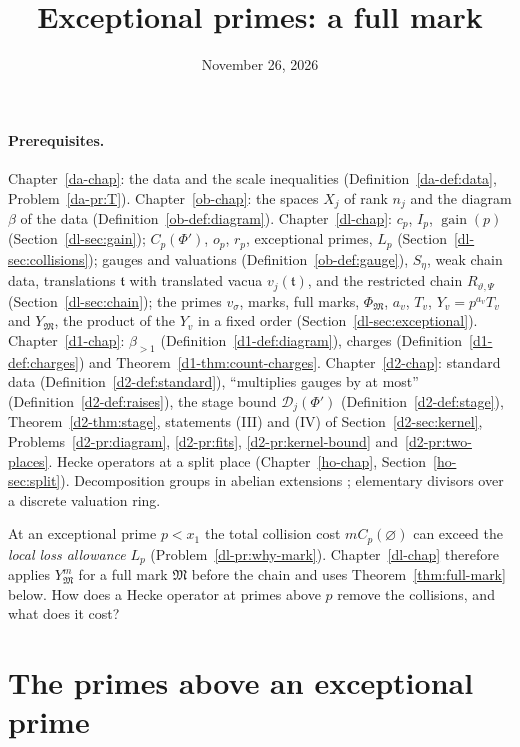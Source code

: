 \documentclass[reqno]{amsart}
\title{Exceptional primes: a full mark}
\author{}
\date{November 26, 2026}
\newcounter{chap}
\theoremstyle{plain}
\theoremstyle{definition}
\theoremstyle{remark}
\newcommand{\Dc}{\mathcal D}
\newcommand{\Mk}{\mathfrak M}
\newcommand{\gain}{\operatorname{gain}}
\newcommand{\bl}{\beta_{>1}}
\begin{document}
\maketitle
{}\label{chap}

\paragraph{Prerequisites.}
Chapter~\ref{da-chap}: the data and the scale inequalities (Definition~\ref{da-def:data}, Problem~\ref{da-pr:T}).  Chapter~\ref{ob-chap}: the spaces \(X_j\) of rank \(n_j\) and the diagram \(\beta\) of the data (Definition~\ref{ob-def:diagram}).  Chapter~\ref{dl-chap}: \(c_p\), \(I_p\), \(\gain(p)\) (Section~\ref{dl-sec:gain}); \(C_p(\Phi')\), \(o_p\), \(r_p\), exceptional primes, \(L_p\) (Section~\ref{dl-sec:collisions}); gauges and valuations (Definition~\ref{ob-def:gauge}), \(S_\eta\), weak chain data, translations \(\mathfrak t\) with translated vacua \(v_j(\mathfrak t)\), and the restricted chain \(R_{\vartheta,\Psi}\) (Section~\ref{dl-sec:chain}); the primes \(v_\sigma\), marks, full marks, \(\Phi_{\Mk}\), \(a_v\), \(T_v\), \(Y_v = p^{a_v}T_v\) and \(Y_{\Mk}\), the product of the \(Y_v\) in a fixed order (Section~\ref{dl-sec:exceptional}).  Chapter~\ref{d1-chap}: \(\bl\) (Definition~\ref{d1-def:diagram}), charges (Definition~\ref{d1-def:charges}) and Theorem~\ref{d1-thm:count-charges}.  Chapter~\ref{d2-chap}: standard data (Definition~\ref{d2-def:standard}), ``multiplies gauges by at most'' (Definition~\ref{d2-def:raises}), the stage bound \(\Dc_j(\Phi')\) (Definition~\ref{d2-def:stage}), Theorem~\ref{d2-thm:stage}, statements (III) and (IV) of Section~\ref{d2-sec:kernel}, Problems~\ref{d2-pr:diagram}, \ref{d2-pr:fits}, \ref{d2-pr:kernel-bound} and~\ref{d2-pr:two-places}.  Hecke operators at a split place (Chapter~\ref{ho-chap}, Section~\ref{ho-sec:split}).  Decomposition groups in abelian extensions \cite[Ch.~I, \S9]{Ne}; elementary divisors over a discrete valuation ring.

\medskip
At an exceptional prime \(p < x_1\) the total collision cost \(m C_p(\varnothing)\) can exceed the \emph{local loss allowance} \(L_p\) (Problem~\ref{dl-pr:why-mark}).  Chapter~\ref{dl-chap} therefore applies \(Y_{\Mk}^m\) for a full mark \(\Mk\) before the chain and uses Theorem~\ref{thm:full-mark} below.  How does a Hecke operator at primes above \(p\) remove the collisions, and what does it cost?

\section{The primes above an exceptional prime}\label{sec:primes}
\end{document}
